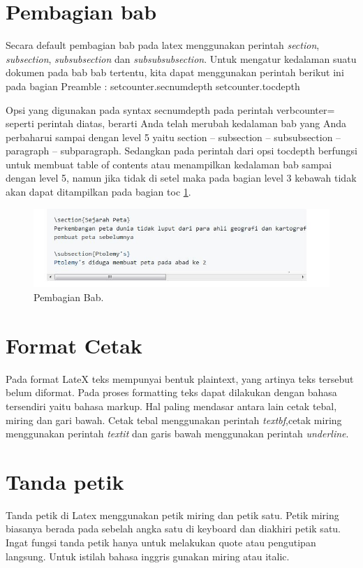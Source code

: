 \section{Pembagian bab}
Secara default pembagian bab pada latex menggunakan perintah \textit{section}, \textit{subsection}, \textit{subsubsection} dan \textit{subsubsubsection}. Untuk mengatur kedalaman suatu dokumen pada bab bab tertentu, kita dapat menggunakan perintah berikut ini pada bagian Preamble :
setcounter.secnumdepth
setcounter.tocdepth



Opsi yang digunakan pada syntax secnumdepth pada perintah verbcounter= seperti perintah diatas, berarti Anda telah merubah kedalaman bab yang Anda perbaharui sampai dengan level 5 yaitu section -- subsection -- subsubsection -- paragraph -- subparagraph. Sedangkan pada perintah dari opsi tocdepth berfungsi untuk membuat table of contents atau menampilkan kedalaman bab sampai dengan level 5, namun jika tidak di setel maka pada bagian level 3 kebawah tidak akan dapat ditampilkan pada bagian toc \ref{labelgambar}.


\begin{figure}[ht]
\centerline{\includegraphics[width=1\textwidth]{figures/capture.JPG}}
\caption{Pembagian Bab.}
\label{labelgambar}
\end{figure}


\section{Format Cetak}
Pada format LateX teks mempunyai bentuk plaintext, yang artinya teks tersebut belum diformat. Pada proses formatting teks dapat dilakukan dengan bahasa tersendiri yaitu bahasa markup. Hal paling mendasar antara lain cetak tebal, miring dan gari bawah. Cetak tebal menggunakan perintah \textit{textbf},cetak miring menggunakan perintah \textit{textit} dan garis bawah menggunakan perintah \textit{underline}.

\section{Tanda petik}
Tanda petik di Latex menggunakan petik miring dan petik satu. Petik miring biasanya berada pada sebelah angka satu di keyboard dan diakhiri petik satu. Ingat fungsi tanda petik hanya untuk melakukan quote atau pengutipan langsung. Untuk istilah bahasa inggris gunakan miring atau italic.

